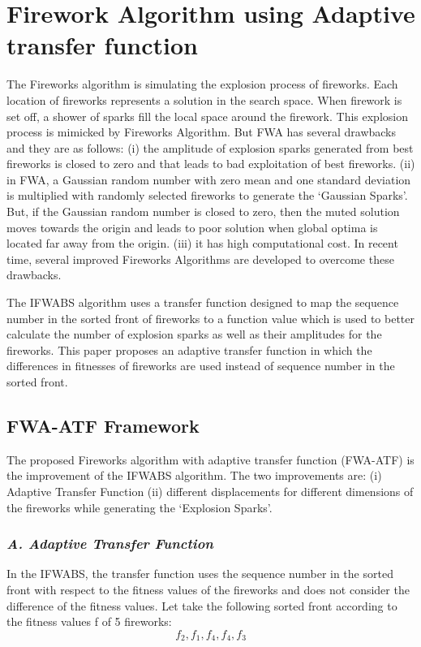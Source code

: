 \documentclass[11pt, a4paper]{report}
\begin{document}
\newpage
\goodbreak

\section{Firework Algorithm using Adaptive transfer function}
The Fireworks algorithm is simulating the explosion process of fireworks. Each location of fireworks represents a solution in the search space. When firework is set
off, a shower of sparks fill the local space around the firework.
This explosion process is mimicked by Fireworks Algorithm. But FWA has several drawbacks and they are as follows: (i) the amplitude of explosion sparks generated from best fireworks is closed to zero and that leads to bad exploitation of best fireworks. (ii) in FWA, a Gaussian random number with zero mean and one standard deviation is multiplied with randomly selected fireworks to generate the ‘Gaussian Sparks’. But, if the Gaussian random number is closed to zero, then the muted solution moves towards the origin and leads to poor solution when global optima is located far away from the origin. (iii) it has high computational cost. In recent time, several improved Fireworks Algorithms are developed to overcome these drawbacks.


The IFWABS algorithm uses a transfer function designed to map the sequence number in the sorted front of fireworks to a function value which is used to better calculate the number of explosion sparks as well as their amplitudes for the fireworks. This paper proposes an adaptive transfer function in which the differences in fitnesses of fireworks are used instead of sequence number in the sorted front. \cite{paper:fwa-atf}

\subsection{FWA-ATF Framework}
The proposed Fireworks algorithm with adaptive transfer function (FWA-ATF) is the improvement of the IFWABS algorithm. The two improvements are: (i) Adaptive Transfer Function (ii) different displacements for different dimensions of the fireworks while generating the ‘Explosion Sparks’.

\subsubsection{\textit{A. Adaptive Transfer Function}}
In the IFWABS, the transfer function uses the sequence number in the sorted front with respect to the fitness values of the fireworks and does not consider the difference of the fitness values. Let take the following sorted front according to the fitness values f of 5 fireworks:
\begin{equation}
f_{2},f_{1},f_{4},f_{4},f_{3}
\end{equation}
\end{document}
